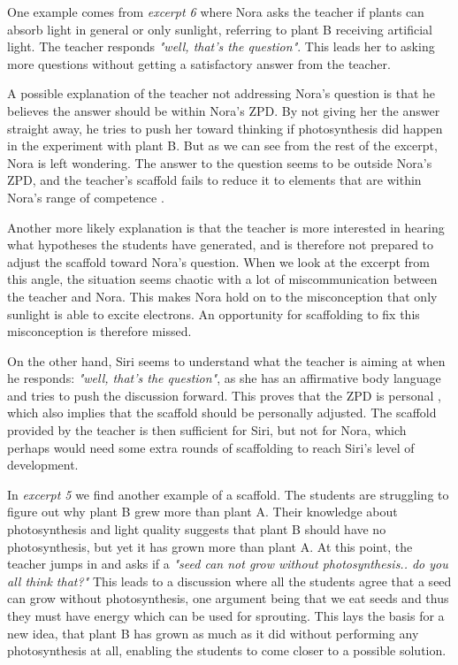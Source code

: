 One example comes from \emph{excerpt 6} where Nora asks the teacher if plants can absorb light in general or only sunlight, referring to plant B receiving artificial light. The teacher responds \emph{"well, that's the question"}. This leads her to asking more questions without getting a satisfactory answer from the teacher. 

A possible explanation of the teacher not addressing Nora's question is that he believes the answer should  be within Nora's ZPD. By not giving her the answer straight away, he tries to push her toward thinking if photosynthesis did happen in the experiment with plant B. But as we can see from the rest of the excerpt, Nora is left wondering. The answer to the question seems to be outside Nora's ZPD, and the teacher's scaffold fails to reduce it to elements that are within Nora's range of competence \citep{wood1976role}. 

Another more likely explanation is that the teacher is more interested in hearing what hypotheses the students have generated, and is therefore not prepared to adjust the scaffold toward Nora's question. When we look at the excerpt from this angle, the situation seems chaotic with a lot of miscommunication between the teacher and Nora. This makes Nora hold on to the misconception that only sunlight is able to excite electrons. An opportunity for scaffolding to fix this misconception is therefore missed.  

On the other hand, Siri seems to understand what the teacher is aiming at when he responds: \emph{"well, that's the question"}, as she has an affirmative body language and tries to push the discussion forward. This proves that the ZPD is personal \citep{vygotskiui1978mind}, which also implies that the scaffold should be personally adjusted. The scaffold provided by the teacher is then sufficient for Siri, but not for Nora, which perhaps would need some extra rounds of scaffolding to reach Siri's level of development. 

In \emph{excerpt 5} we find another example of a scaffold. The students are struggling to figure out why plant B grew more than plant A. Their knowledge about photosynthesis and light quality suggests that plant B should have no photosynthesis, but yet it has grown more than plant A. At this point, the teacher jumps in and asks if a \emph{"seed can not grow without photosynthesis.. do you all think that?"} This leads to a discussion where all the students agree that a seed can grow without photosynthesis, one argument being that we eat seeds and thus they must have energy which can be used for sprouting. This lays the basis for a new idea, that plant B has grown as much as it did without performing any photosynthesis at all, enabling the students to come closer to a possible solution. 

